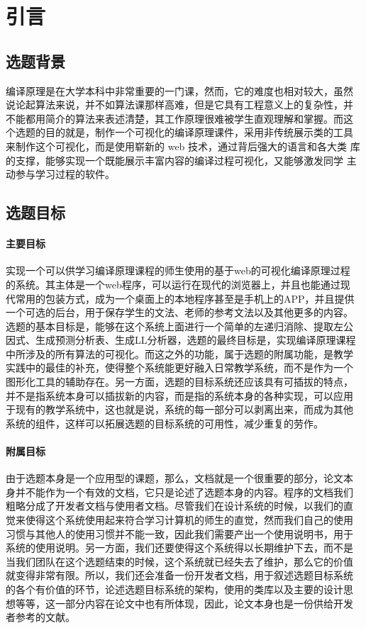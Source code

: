\section{引言}
\subsection{选题背景}
编译原理是在大学本科中非常重要的一门课，然而，它的难度也相对较大，虽然
说论起算法来说，并不如算法课那样高难，但是它具有工程意义上的复杂性，并
不能都用简介的算法来表述清楚，其工作原理很难被学生直观理解和掌握。而这
个选题的目的就是，制作一个可视化的编译原理课件，采用非传统展示类的工具
来制作这个可视化，而是使用崭新的 web 技术，通过背后强大的语言和各大类
库的支撑，能够实现一个既能展示丰富内容的编译过程可视化，又能够激发同学
主动参与学习过程的软件。
\subsection{选题目标}
\paragraph{主要目标}
实现一个可以供学习编译原理课程的师生使用的基于web的可视化编译原理过程
的系统。其主体是一个web程序，可以运行在现代的浏览器上，并且也能通过现
代常用的包装方式，成为一个桌面上的本地程序甚至是手机上的APP，并且提供
一个可选的后台，用于保存学生的文法、老师的参考文法以及其他更多的内容。
选题的基本目标是，能够在这个系统上面进行一个简单的左递归消除、提取左公
因式、生成预测分析表、生成LL分析器，选题的最终目标是，实现编译原理课程
中所涉及的所有算法的可视化。而这之外的功能，属于选题的附属功能，是教学
实践中的最佳的补充，使得整个系统能更好融入日常教学系统，而不是作为一个
图形化工具的辅助存在。另一方面，选题的目标系统还应该具有可插拔的特点，
并不是指系统本身可以插拔新的内容，而是指的系统本身的各种实现，可以应用
于现有的教学系统中，这也就是说，系统的每一部分可以剥离出来，而成为其他
系统的组件，这样可以拓展选题的目标系统的可用性，减少重复的劳作。
\paragraph{附属目标}
由于选题本身是一个应用型的课题，那么，文档就是一个很重要的部分，论文本
身并不能作为一个有效的文档，它只是论述了选题本身的内容。程序的文档我们
粗略分成了开发者文档与使用者文档。尽管我们在设计系统的时候，以我们的直
觉来使得这个系统使用起来符合学习计算机的师生的直觉，然而我们自己的使用
习惯与其他人的使用习惯并不能一致，因此我们需要产出一个使用说明书，用于
系统的使用说明。另一方面，我们还要使得这个系统得以长期维护下去，而不是
当我们团队在这个选题结束的时候，这个系统就已经失去了维护，那么它的价值
就变得非常有限。所以，我们还会准备一份开发者文档，用于叙述选题目标系统
的各个有价值的环节，论述选题目标系统的架构，使用的类库以及主要的设计思
想等等，这一部分内容在论文中也有所体现，因此，论文本身也是一份供给开发
者参考的文献。